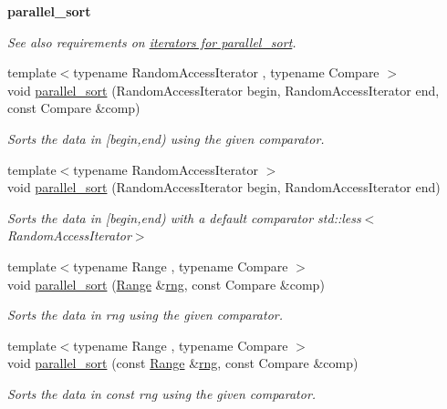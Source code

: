 \begin{Indent}{\bf parallel\+\_\+sort}\par
{\em See also requirements on \hyperlink{parallel_sort_iter_req}{iterators for parallel\+\_\+sort}. }\begin{DoxyCompactItemize}
\item 
{\footnotesize template$<$typename Random\+Access\+Iterator , typename Compare $>$ }\\void \hyperlink{group__algorithms_gabdc90813499f91d3e32298cd6dc2fe45}{parallel\+\_\+sort} (Random\+Access\+Iterator begin, Random\+Access\+Iterator end, const Compare \&comp)
\begin{DoxyCompactList}\small\item\em Sorts the data in \mbox{[}begin,end) using the given comparator. \end{DoxyCompactList}\item 
{\footnotesize template$<$typename Random\+Access\+Iterator $>$ }\\void \hyperlink{group__algorithms_ga73b58ac9249f49587d0b081c152af551}{parallel\+\_\+sort} (Random\+Access\+Iterator begin, Random\+Access\+Iterator end)
\begin{DoxyCompactList}\small\item\em Sorts the data in \mbox{[}begin,end) with a default comparator {\ttfamily std\+::less$<$\+Random\+Access\+Iterator$>$} \end{DoxyCompactList}\item 
{\footnotesize template$<$typename Range , typename Compare $>$ }\\void \hyperlink{group__algorithms_ga61ce8ba64868c5c15f9d98840193b9bf}{parallel\+\_\+sort} (\hyperlink{classtbb_1_1blocked__range}{Range} \&\hyperlink{structrng}{rng}, const Compare \&comp)
\begin{DoxyCompactList}\small\item\em Sorts the data in rng using the given comparator. \end{DoxyCompactList}\item 
{\footnotesize template$<$typename Range , typename Compare $>$ }\\void \hyperlink{group__algorithms_ga541b2fd91e88842a7b823161107779e9}{parallel\+\_\+sort} (const \hyperlink{classtbb_1_1blocked__range}{Range} \&\hyperlink{structrng}{rng}, const Compare \&comp)
\begin{DoxyCompactList}\small\item\em Sorts the data in const rng using the given comparator. \end{DoxyCompactList}\item 

\end{DoxyCompactItemize}
\end{Indent}
